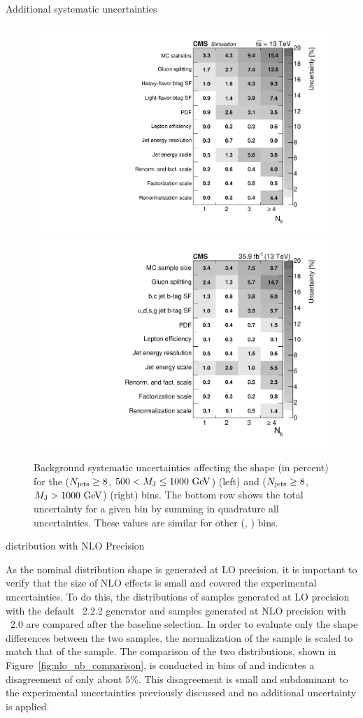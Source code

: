 \begin{section}{Additional systematic uncertainties}
\begin{figure}[tbp!]
\begin{center}
\includegraphics[angle=0,width=0.45\columnwidth]{fig/table_bkg_systs_bin20.pdf}
\includegraphics[angle=0,width=0.45\columnwidth]{fig/table_bkg_systs_bin21.pdf}
\end{center}
\caption{Background systematic uncertainties affecting the \Nb shape (in percent) for the ($N_{\mathrm{jets}} \geq 8$, $500 < M_{\mathrm{J}} \leq 1000~\mathrm{Ge\kern -0.1em V}$) (left) and ($N_{\mathrm{jets}} \geq 8$, $M_{\mathrm{J}} > 1000~\mathrm{Ge\kern -0.1em V}$) (right) bins.
The bottom row shows the total uncertainty for a given \Nb bin by summing in quadrature all uncertainties.
These values are similar for other (\Njets, \MJ) bins.}
\label{fig:bkg_sys_tables}
\end{figure}

\begin{subsection}{\Nb distribution with NLO Precision}

As the nominal \Nb distribution shape is generated at LO precision, it is important to verify that the size of NLO effects is small and covered the experimental uncertainties.
To do this, the \Nb distributions of \ttbar samples generated at LO precision with the default \MGatNLO~2.2.2 generator and samples generated at NLO precision with \POWHEG~2.0 are compared after the baseline selection.
In order to evaluate only the shape differences between the two samples, the normalization of the \MGatNLO sample is scaled to match that of the \POWHEG sample.
The comparison of the two distributions, shown in Figure~\ref{fig:nlo_nb_comparison}, is conducted in bins of \Njets and indicates a disagreement of only about $5\%$.
This disagreement is small and subdominant to the experimental uncertainties previously discussed and no additional uncertainty is applied.


\end{subsection}
\end{section}
